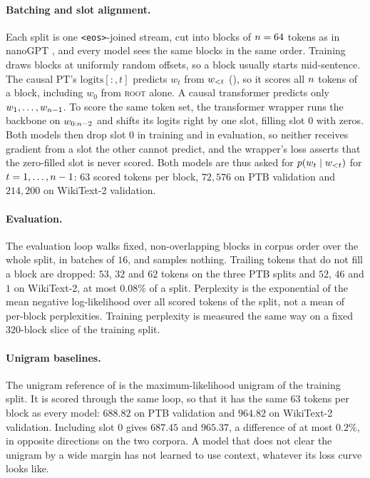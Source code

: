 \paragraph{Batching and slot alignment.}
Each split is one \texttt{<eos>}-joined stream, cut into blocks of $n = 64$ tokens as in
nanoGPT \citep{karpathy2022nanogpt}, and every model sees the same blocks in the same order.
Training draws blocks at uniformly random offsets, so a block usually starts mid-sentence. The
causal PT's $\text{logits}[:,t]$ predicts $w_t$ from $w_{{<}t}$ (), so
it scores all $n$ tokens of a block, including $w_0$ from \textsc{root} alone. A causal
transformer predicts only $w_1,\dots,w_{n-1}$. To score the same token set, the
transformer wrapper runs the backbone on $w_{0:n-2}$ and shifts its logits right by one
slot, filling slot $0$ with zeros. Both models then drop slot $0$ in training and in evaluation,
so neither receives gradient from a slot the other cannot predict, and the wrapper's loss
asserts that the zero-filled slot is never scored. Both models are thus asked for
$p(w_t \mid w_{{<}t})$ for $t = 1,\dots,n-1$: $63$ scored tokens per block,
$72{,}576$ on PTB validation and $214{,}200$ on WikiText-2 validation.

\paragraph{Evaluation.}
The evaluation loop walks fixed, non-overlapping blocks in corpus order over the whole split, in
batches of $16$, and samples nothing. Trailing tokens that do not fill a block are dropped: $53$, $32$
and $62$ tokens on the three PTB splits and $52$, $46$ and $1$ on WikiText-2, at most $0.08\%$
of a split. Perplexity is the exponential of the mean negative log-likelihood over all scored tokens of the
split, not a mean of per-block perplexities. Training perplexity is measured the same way on a fixed $320$-block slice of the
training split.

\paragraph{Unigram baselines.}
The unigram reference of  is the maximum-likelihood unigram of the training
split. It is scored through the same loop, so that it has the same $63$ tokens per block as
every model: $688.82$ on PTB validation and $964.82$ on WikiText-2 validation. Including slot $0$
gives $687.45$ and $965.37$, a difference of at most $0.2\%$, in opposite directions on the two
corpora. A model that does not clear the unigram by a wide margin has not learned to use
context, whatever its loss curve looks like.

